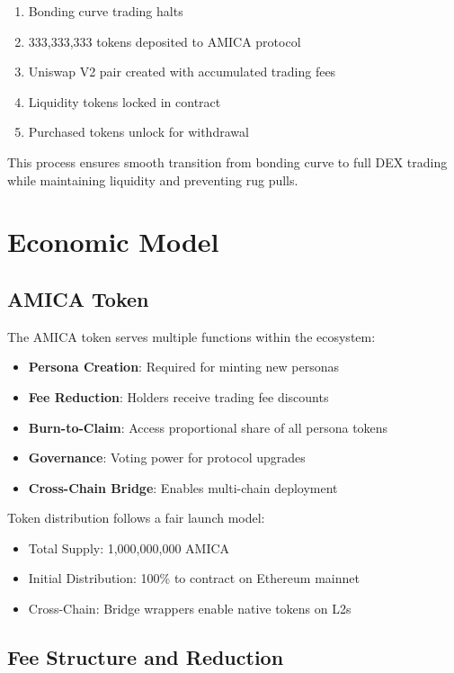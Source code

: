 \documentclass{article}
\begin{document}
\begin{enumerate}
    \item Bonding curve trading halts
    \item 333,333,333 tokens deposited to AMICA protocol
    \item Uniswap V2 pair created with accumulated trading fees
    \item Liquidity tokens locked in contract
    \item Purchased tokens unlock for withdrawal
\end{enumerate}

This process ensures smooth transition from bonding curve to full DEX trading while maintaining liquidity and preventing rug pulls.

\section{Economic Model}

\subsection{AMICA Token}

The AMICA token serves multiple functions within the ecosystem:

\begin{itemize}
    \item \textbf{Persona Creation}: Required for minting new personas
    \item \textbf{Fee Reduction}: Holders receive trading fee discounts
    \item \textbf{Burn-to-Claim}: Access proportional share of all persona tokens
    \item \textbf{Governance}: Voting power for protocol upgrades
    \item \textbf{Cross-Chain Bridge}: Enables multi-chain deployment
\end{itemize}

Token distribution follows a fair launch model:
\begin{itemize}
    \item Total Supply: 1,000,000,000 AMICA
    \item Initial Distribution: 100\% to contract on Ethereum mainnet
    \item Cross-Chain: Bridge wrappers enable native tokens on L2s
\end{itemize}

\subsection{Fee Structure and Reduction}
\end{document}
